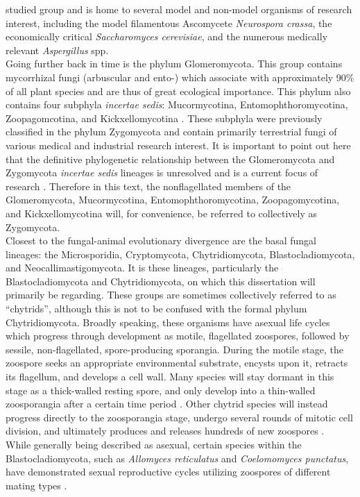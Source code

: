 studied group and is home to several model and non-model organisms of
research interest, including the model filamentous Ascomycete
\textit{Neurospora crassa}, the economically critical
\textit{Saccharomyces cerevisiae}, and the numerous medically relevant
\textit{Aspergillus} spp.\\
\indent Going further back in time is the phylum Glomeromycota. This
group contains mycorrhizal fungi (arbuscular and ento-) which
associate with approximately 90\% of all plant species and are thus of
great ecological importance. This phylum also contains four subphyla
\textit{incertae sedis}: Mucormycotina, Entomophthoromycotina,
Zoopagomcotina, and Kickxellomycotina \cite{White2006}. These subphyla
were previously classified in the phylum Zygomycota and contain
primarily terrestrial fungi of various medical and industrial research
interest. It is important to point out here that the definitive
phylogenetic relationship between the Glomeromycota and Zygomycota
\textit{incertae sedis} lineages is unresolved and is a current focus
of research \cite{Hibbett2007}. Therefore in this text, the
nonflagellated members of the Glomeromycota, Mucormycotina,
Entomophthoromycotina, Zoopagomycotina, and Kickxellomycotina will,
for convenience, be referred to collectively as Zygomycota.\\
\indent Closest to the fungal-animal evolutionary divergence are the
basal fungal lineages: the Microsporidia, Cryptomycota,
Chytridiomycota, Blastocladiomycota, and Neocallimastigomycota. It is
these lineages, particularly the Blastocladiomycota and
Chytridiomycota, on which this dissertation will primarily be
regarding. These groups are sometimes collectively referred to as
\enquote{chytrids}, although this is not to be confused with the formal phylum
Chytridiomycota. Broadly speaking, these organisms have asexual life
cycles which progress through development as motile, flagellated
zoospores, followed by sessile, non-flagellated, spore-producing
sporangia. During the motile stage, the zoospore seeks an appropriate
environmental substrate, encysts upon it, retracts its flagellum, and
develops a cell wall. Many species will stay dormant in this stage as
a thick-walled resting spore, and only develop into a thin-walled
zoosporangia after a certain time period \cite{James2006Blasto}. Other
chytrid species will instead progress directly to the zoosporangia
stage, undergo several rounds of mitotic cell division, and ultimately
produces and releases hundreds of new zoospores
\cite{James2006Blasto}. \\
\indent While generally being described as asexual, certain species
within the Blastocladiomycota, such as \textit{Allomyces reticulatus}
and \textit{Coelomomyces punctatus}, have demonstrated sexual
reproductive cycles utilizing zoospores of different mating types
\cite{Alexopoulos1996}.\\

